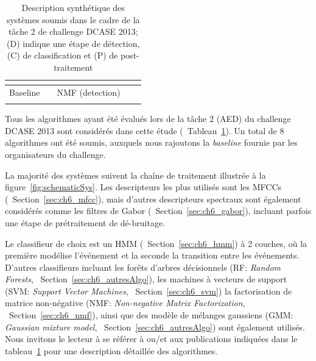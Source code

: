 \begin{table}[t]
\begin{center}
\begin{tabular}{lcccc}
\citep{VVK,gemmeke2013exemplar}     &                      &                              &           &             \\    
\hline
Baseline \hfill                     &                      & NMF (detection)              &           &             \\ 
\citep{Giannoulis:2013a}            &                      &                              &           &             \\  
\hline      
\end{tabular}
\end{center}
\caption[Description synthétique des systèmes soumis dans le cadre de la tâche 2 de challenge DCASE 2013]{Description synthétique des systèmes soumis dans le cadre de la tâche 2 de challenge DCASE 2013; (D) indique une étape de détection, (C) de classification et (P) de post-traitement}
\label{tab:systemsDcase2013}
\end{table}

Tous les algorithmes ayant été évalués lors de la tâche 2 (AED) du challenge DCASE 2013 sont considérés dans cette étude (\cf~Tableau~\ref{tab:systemsDcase2013}). Un total de 8 algorithmes ont été soumis, auxquels nous rajoutons la \emph{baseline} fournie par les organisateurs du challenge.

La majorité des systèmes suivent la chaîne de traitement illustrée à la figure~\ref{fig:schematicSys}. Les descripteurs les plus utilisés sont les MFCCs (\cf~Section~\ref{sec:ch6_mfcc}), mais d'autres descripteurs spectraux sont également considérés comme les filtres de Gabor (\cf~Section~\ref{sec:ch6_gabor}), incluant parfois une étape de prétraitement de dé-bruitage.

Le classifieur de choix est un HMM (\cf~Section~\ref{sec:ch6_hmm})  à 2 couches, où la première modélise l'événement et la seconde la transition entre les événements. D'autres classifieurs incluant les forêts d'arbres décisionnels (RF: \emph{Random Forests}, \cf~Section~\ref{sec:ch6_autresAlgo}), les machines à vecteurs de support (SVM: \emph{Support Vector Machines}, \cf~Section~\ref{sec:ch6_svm}) la factorisation de matrice non-négative (NMF: \emph{Non-negative Matrix Factorization}, \cf~Section~\ref{sec:ch6_nmf}), ainsi que des modèle de mélanges gaussiens (GMM: \emph{Gaussian mixture model}, \cf~Section~\ref{sec:ch6_autresAlgo}) sont également utilisés. Nous invitons le lecteur à se référer à \citep{Stowell15} ou/et aux publications indiquées dans le tableau~\ref{tab:systemsDcase2013} pour une description détaillée des algorithmes.


